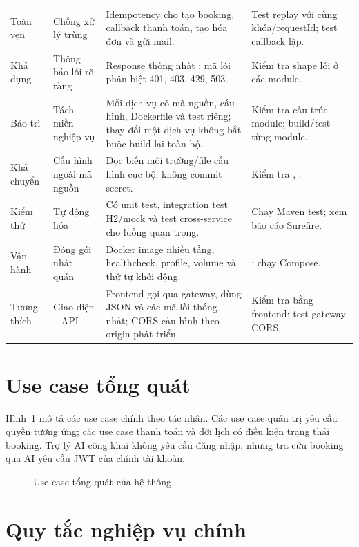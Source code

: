 \begin{longtable}{@{}L{2.5cm}L{4.2cm}L{4.0cm}L{3.83cm}@{}}
Toàn vẹn & Chống xử lý trùng & Idempotency cho tạo booking, callback thanh toán, tạo hóa đơn và gửi mail. & Test replay với cùng khóa/requestId; test callback lặp.\\
Khả dụng & Thông báo lỗi rõ ràng & Response thống nhất ; mã lỗi phân biệt 401, 403, 429, 503. & Kiểm tra shape lỗi ở các module.\\
Bảo trì & Tách miền nghiệp vụ & Mỗi dịch vụ có mã nguồn, cấu hình, Dockerfile và test riêng; thay đổi một dịch vụ không bắt buộc build lại toàn bộ. & Kiểm tra cấu trúc module; build/test từng module.\\
Khả chuyển & Cấu hình ngoài mã nguồn & Đọc biến môi trường/file cấu hình cục bộ; không commit secret. & Kiểm tra , .\\
Kiểm thử & Tự động hóa & Có unit test, integration test H2/mock và test cross-service cho luồng quan trọng. & Chạy Maven test; xem báo cáo Surefire.\\
Vận hành & Đóng gói nhất quán & Docker image nhiều tầng, healthcheck, profile, volume và thứ tự khởi động. & ; chạy Compose.\\
Tương thích & Giao diện -- API & Frontend gọi qua gateway, dùng JSON và các mã lỗi thống nhất; CORS cấu hình theo origin phát triển. & Kiểm tra bằng frontend; test gateway CORS.\\
\end{longtable}

\section{Use case tổng quát}
\label{sec:usecase}

Hình~\ref{fig:usecase} mô tả các use case chính theo tác nhân. Các use case quản trị yêu cầu quyền tương ứng; các use case thanh toán và dời lịch có điều kiện trạng thái booking. Trợ lý AI công khai không yêu cầu đăng nhập, nhưng tra cứu booking qua AI yêu cầu JWT của chính tài khoản.

\begin{figure}[H]
\centering
\resizebox{\textwidth}{!}{}
\caption{Use case tổng quát của hệ thống}
\label{fig:usecase}
\end{figure}

\section{Quy tắc nghiệp vụ chính}
\label{sec:quy-tac-nghiep-vu}

